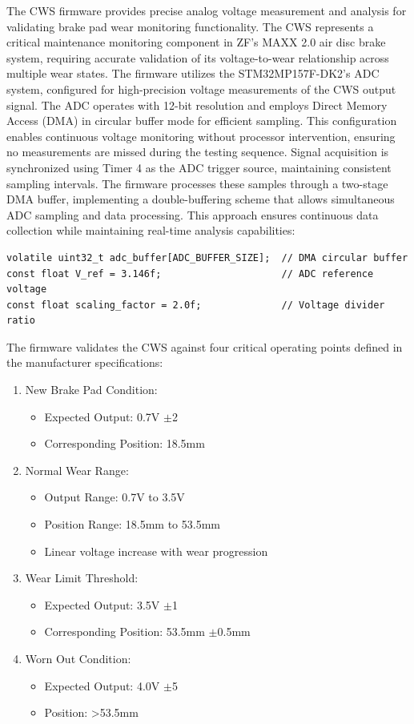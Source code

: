 \documentclass[12pt]{article}
\begin{document}
The CWS firmware provides precise analog voltage measurement and analysis for validating brake pad wear monitoring functionality. The CWS represents a critical maintenance monitoring component in ZF's MAXX 2.0 air disc brake system, requiring accurate validation of its voltage-to-wear relationship across multiple wear states.
The firmware utilizes the STM32MP157F-DK2's ADC system, configured for high-precision voltage measurements of the CWS output signal. The ADC operates with 12-bit resolution and employs Direct Memory Access (DMA) in circular buffer mode for efficient sampling. This configuration enables continuous voltage monitoring without processor intervention, ensuring no measurements are missed during the testing sequence.
Signal acquisition is synchronized using Timer 4 as the ADC trigger source, maintaining consistent sampling intervals. The firmware processes these samples through a two-stage DMA buffer, implementing a double-buffering scheme that allows simultaneous ADC sampling and data processing. This approach ensures continuous data collection while maintaining real-time analysis capabilities:
\begin{verbatim}
volatile uint32_t adc_buffer[ADC_BUFFER_SIZE];  // DMA circular buffer
const float V_ref = 3.146f;                     // ADC reference voltage
const float scaling_factor = 2.0f;              // Voltage divider ratio
\end{verbatim}
The firmware validates the CWS against four critical operating points defined in the manufacturer specifications:
\begin{enumerate}
\item New Brake Pad Condition:
\begin{itemize}
\item Expected Output: 0.7V $\pm$2%
\item Corresponding Position: 18.5mm
\end{itemize}
\item Normal Wear Range:
\begin{itemize}
\item Output Range: 0.7V to 3.5V
\item Position Range: 18.5mm to 53.5mm
\item Linear voltage increase with wear progression
\end{itemize}
\item Wear Limit Threshold:
\begin{itemize}
\item Expected Output: 3.5V $\pm$1%
\item Corresponding Position: 53.5mm $\pm$0.5mm
\end{itemize}
\item Worn Out Condition:
\begin{itemize}
\item Expected Output: 4.0V $\pm$5%
\item Position: >53.5mm
\end{itemize}
\end{enumerate}
\end{document}
